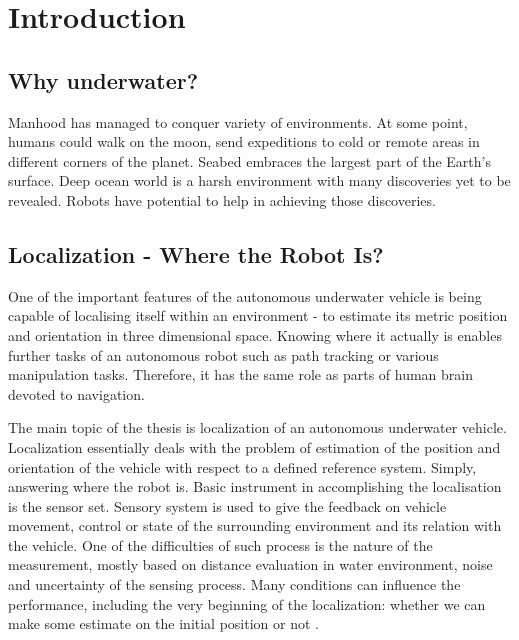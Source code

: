 \chapter{Introduction} \label{chap:intro}
\section{Why underwater?}
Manhood has managed to conquer variety of environments. At some point, humans could walk on the moon, send expeditions to cold or remote areas in different corners of the planet. Seabed embraces the largest part of the Earth's surface. Deep ocean world is a harsh environment with many discoveries yet to be revealed. Robots have potential to help in achieving those discoveries. 
\section{Localization - Where the Robot Is?}
One of the important features of the autonomous underwater vehicle is being capable of localising itself within an environment - to estimate its metric position and orientation in three dimensional space. Knowing where it actually is enables further tasks of an autonomous robot such as path tracking or various manipulation tasks. Therefore, it has the same role as parts of human brain devoted to navigation.  

The main topic of the thesis is localization of an autonomous underwater vehicle. Localization essentially deals with the problem of estimation of the position and orientation of the vehicle with respect to a defined reference system. Simply, answering where the robot is. Basic instrument in accomplishing the localisation is the sensor set. Sensory system is used to give the feedback on vehicle movement, control or state of the surrounding environment and its relation with the vehicle. One of the difficulties of such process is the nature of the measurement, mostly based on distance evaluation in water environment, noise and uncertainty of the sensing process. Many conditions can influence the performance, including the very beginning of the localization: whether we can make some estimate on the initial position or not \cite{ribas10}. 

